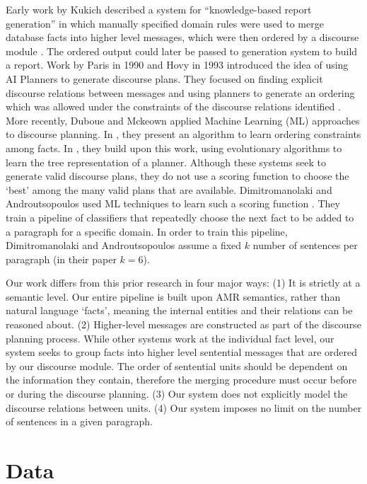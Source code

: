 \documentclass[12pt]{article}
\begin{document}
Early work by Kukich described a system for ``knowledge-based report generation'' in which manually specified domain rules were used to merge database facts into higher level messages, which were then ordered by a discourse module \cite{kukich1983knowledge}. The ordered output could later be passed to generation system to build a report. Work by Paris in 1990 and Hovy in 1993 introduced the idea of using AI Planners to generate discourse plans. They focused on finding explicit discourse relations between messages and using planners to generate an ordering which was allowed under the constraints of the discourse relations identified \cite{paris1990natural}\cite{hovy1993automated}. More recently, Duboue and Mckeown applied Machine Learning (ML) approaches to discourse planning. In \cite{duboue2001empirically}, they present an algorithm to learn ordering constraints among facts. In \cite{duboue2002content}, they build upon this work, using evolutionary algorithms to learn the tree representation of a planner. Although these systems seek to generate valid discourse plans, they do not use a scoring function to choose the `best' among the many valid plans that are available. Dimitromanolaki and Androutsopoulos used ML techniques to learn such a scoring function \cite{learning_to_order_facts}. They train a pipeline of classifiers that repeatedly choose the next fact to be added to a paragraph for a specific domain.
In order to train this pipeline, Dimitromanolaki and Androutsopoulos assume a
fixed $k$ number of sentences per paragraph (in their paper $k=6$).

Our work differs from this prior research in four major ways: (1) It is strictly at a semantic level. Our entire pipeline is built upon AMR semantics, rather than natural language `facts', meaning the internal entities and their relations can be reasoned about. (2) Higher-level messages are constructed as part of the discourse planning process. While other systems work at the individual fact level, our system seeks to group facts into higher level sentential messages that are ordered by our discourse module. The order of sentential units should be dependent on the information they contain, therefore the merging procedure must occur before or during the discourse planning. (3) Our system does not explicitly model the discourse relations between units.
(4) Our system imposes no limit on the number of sentences in a given
paragraph.

\section{Data}
\end{document}
